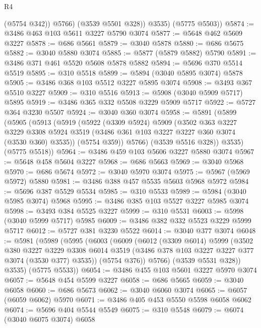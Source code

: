 \begin{lexlean}{R4}
\begin{coremodule}
              (@5754 @342))
            @5766)
          (@3539 @5501 @328))
        @3535)
      (@5775 @5503))
@5874 := @3486 @463 @103 @5611 @3227 @5790 @3074
@5877 := @5648 @462 @5609 @3227
@5878 := @686 @5661
@5879 := @3040 @5878
@5880 := @686 @5675
@5882 := @3040 @5880 @3074
@5885 := @5877 (@5879 @5882) @5790
@5891 := @3486 @371 @461 @5520 @5608 @5878 @5882
@5894 := @5696 @370 @5514 @5519
@5895 := @310 @5518
@5899 := @5894 (@3040 @5895 @3074) @5878
@5905 := @3486 @368 @103 @5512 @3227 @5895 @3074
@5908 := @3493 @367 @5510 @3227
@5909 := @310 @5516
@5913 := @5908 (@3040 @5909 @5717) @5895
@5919 := @3486 @365 @332 @5508 @3229 @5909 @5717
@5922 := @5727 @364 @3230 @5507
@5924 := @3040 @360 @3074
@5958 := @5891
    (@5899
      (@5905
        (@5913
          (@5919
            (@5922
              (@3309 @5924)
              @5909
              (@3502
                @363
                @3227
                @3229
                @3308
                @5924
                @3519
                (@3486 @361 @103 @3227 @3227 @360 @3074 (@3530 @360) @3535))
              (@5754 @359))
            @5766)
          (@3539 @5516 @328))
        @3535)
      (@5775 @5518))
@5964 := @3486 @459 @103 @5606 @3227 @5880 @3074
@5967 := @5648 @458 @5604 @3227
@5968 := @686 @5663
@5969 := @3040 @5968
@5970 := @686 @5674
@5972 := @3040 @5970 @3074
@5975 := @5967 (@5969 @5972) @5880
@5981 := @3486 @388 @457 @5535 @5603 @5968 @5972
@5984 := @5696 @387 @5529 @5534
@5985 := @310 @5533
@5989 := @5984 (@3040 @5985 @3074) @5968
@5995 := @3486 @385 @103 @5527 @3227 @5985 @3074
@5998 := @3493 @384 @5525 @3227
@5999 := @310 @5531
@6003 := @5998 (@3040 @5999 @5717) @5985
@6009 := @3486 @382 @332 @5523 @3229 @5999 @5717
@6012 := @5727 @381 @3230 @5522
@6014 := @3040 @377 @3074
@6048 := @5981
    (@5989
      (@5995
        (@6003
          (@6009
            (@6012
              (@3309 @6014)
              @5999
              (@3502
                @380
                @3227
                @3229
                @3308
                @6014
                @3519
                (@3486 @378 @103 @3227 @3227 @377 @3074 (@3530 @377) @3535))
              (@5754 @376))
            @5766)
          (@3539 @5531 @328))
        @3535)
      (@5775 @5533))
@6054 := @3486 @455 @103 @5601 @3227 @5970 @3074
@6057 := @5648 @454 @5599 @3227
@6058 := @686 @5665
@6059 := @3040 @6058
@6060 := @686 @5673
@6062 := @3040 @6060 @3074
@6065 := @6057 (@6059 @6062) @5970
@6071 := @3486 @405 @453 @5550 @5598 @6058 @6062
@6074 := @5696 @404 @5544 @5549
@6075 := @310 @5548
@6079 := @6074 (@3040 @6075 @3074) @6058

\end{coremodule}
\end{lexlean}
